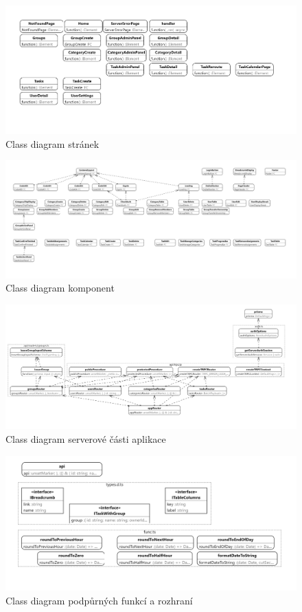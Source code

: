 \documentclass[a4paper,12pt]{report}
\begin{document}
\begin{landscape}
\begin{figure}[hbt!]
	\centering
	\includegraphics[width=1\linewidth]{img/ClassDiagramy/pages_diagram.png}
	\caption{Class diagram stránek}
\end{figure}
\newpage
\begin{figure}[hbt!]
	\centering
	\includegraphics[width=1\linewidth]{img/ClassDiagramy/components_diagram.png}
	\caption{Class diagram komponent}
\end{figure}
\pagebreak
\begin{figure}[hbt!]
	\centering
	\includegraphics[width=1\linewidth]{img/ClassDiagramy/server_diagram.png}
	\caption{Class diagram serverové části aplikace}
\end{figure}
\newpage
\begin{figure}[hbt!]
	\centering
	\includegraphics[width=1\linewidth]{img/ClassDiagramy/utils_diagram.png}
	\caption{Class diagram podpůrných funkcí a rozhraní}
\end{figure}

\pagebreak
\end{landscape}
\end{document}
